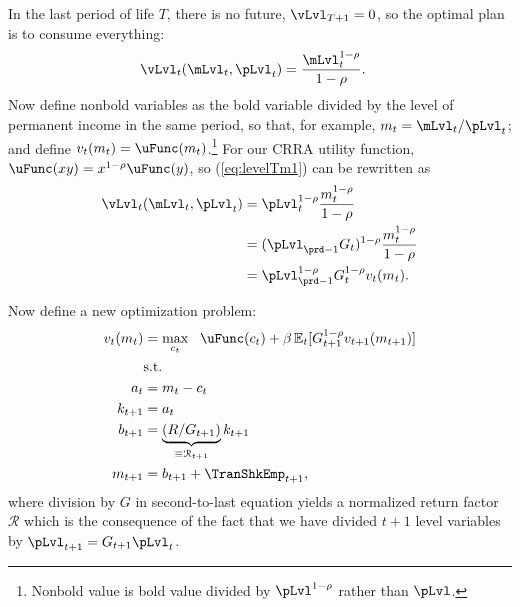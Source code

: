 \documentclass[titlepage, headings=optiontotocandhead]{Resources/texmf-local/tex/latex/econtex}
\begin{document}
In the last {period} of life $T$, there is no future, $\vLvl_{T+1} = 0$, so the optimal plan is to consume everything:
\begin{equation}\begin{gathered}\begin{aligned}
      \vLvl_{t}(\mLvl_{t},\pLvl_{t})  & = \frac{\mLvl_{t}^{1-\rho}}{1-\rho}. \label{eq:levelTm1}
    \end{aligned}\end{gathered}\end{equation}
Now define nonbold variables as the bold variable divided by the level of permanent income in the same period, so that, for example, $m_{t}=\mLvl_{t}/\pLvl_{t}$; and define $v_{t}(m_{t}) = \uFunc(m_{t})$.\footnote{Nonbold value is bold value divided by $\pLvl^{1-\rho}$ rather than $\pLvl$.}  For our CRRA utility function, $\uFunc(xy)=x^{1-\rho}\uFunc(y)$, so (\ref{eq:levelTm1}) can be rewritten as
\begin{equation}\begin{gathered}\begin{aligned}
      \vLvl_{t}(\mLvl_{t},\pLvl_{t}) & = \pLvl_{t}^{1-\rho}\frac{{m}_{t}^{1-\rho}}{1-\rho}                       \\
                                                & = (\pLvl_{\prd-1}G_{t})^{1-\rho}\frac{{m}_{t}^{1-\rho}}{1-\rho} \\
                                                &= \pLvl_{\prd-1}^{1-\rho}G_{t}^{1-\rho}v_{t}(m_{t}). \label{eq:vT}
    \end{aligned}\end{gathered}\end{equation}

Now define a new optimization problem:
  \begin{equation}\begin{gathered}\begin{aligned}
        v_{t}(m_{t}) & = \max_{{c}_{t}} ~~ \uFunc(c_{t})+{\beta}\Ex_{t}[ G_{t+1}^{1-\rho}v_{t+1}(m_{t+1})] \label{eq:vNormed}                   \\
                                         & \text{s.t.}                                                                                 \\
        a_{t}                       & = m_{t}-c_{t}                                                                     \\
        k_{t+1}                     & = a_{t}                                                                                \\
        b_{t+1}                     & = \underbrace{\left(R/G_{t+1}\right)}_{\equiv \mathcal{R}_{t+1}}k_{t+1} \\
        m_{t+1}                        & = b_{t+1}+\TranShkEmp_{t+1},
      \end{aligned}\end{gathered}\end{equation}
where division by $G$ in second-to-last equation yields a normalized return factor $\mathcal{R}$ which is the consequence of the fact that we have divided $t+1$ level variables by $\pLvl_{t+1}=G_{t+1}\pLvl_{t}$.
\end{document}
